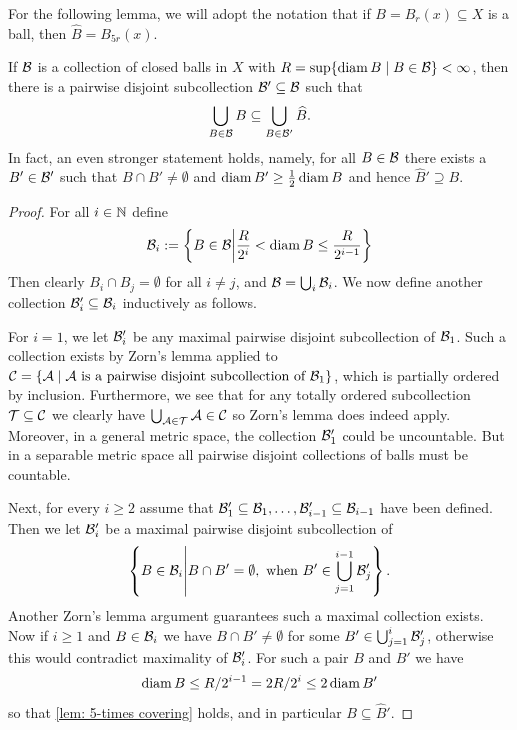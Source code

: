 For the following lemma, we will adopt the notation that if $B=B_r(x) \subseteq X$ is a ball, then $\widehat B=B_{5r}(x)$.
\begin{lemma}\label{lem: 5-times covering}
If $\mathcal{B}$ is a collection of closed balls in $X$ with $R=\sup\{\operatorname{diam} B \mid B \in \mathcal{B}\} < \infty$, then there is a pairwise disjoint subcollection $\mathcal{B}' \subseteq \mathcal{B}$ such that
\[
    \bigcup_{B \in \mathcal{B}} B \subseteq \bigcup_{B \in \mathcal{B}'} \widehat B.
\]
In fact, an even stronger statement holds, namely, for all $B \in \mathcal{B}$ there exists a $B' \in \mathcal{B}'$ such that $B \cap B' \neq \emptyset$ and $\operatorname{diam} B' \ge \frac{1}{2}\operatorname{diam} B$ and hence $\widehat B' \supseteq B$.
\end{lemma}
\begin{proof}
For all $i \in \mathbb{N}$ define
\[
    \mathcal{B}_i := \left\{ B \in \mathcal{B} \middle| \frac{R}{2^i} < \operatorname{diam} B \le \frac{R}{2^{i-1}} \right\}
\]
Then clearly $B_i \cap B_j = \emptyset$ for all $i \neq j$, and $\mathcal{B} = \bigcup_i \mathcal{B}_i$. We now define another collection $\mathcal{B}'_i \subseteq \mathcal{B}_i$ inductively as follows.

For $i=1$, we let $\mathcal{B}'_i$ be any maximal pairwise disjoint subcollection of $\mathcal{B}_1$. Such a collection exists by Zorn's lemma applied to $\mathcal{C} = \{ \mathcal{A} \mid \mathcal{A} \text{ is a pairwise disjoint subcollection of } \mathcal{B}_1\}$, which is partially ordered by inclusion. Furthermore, we see that for any totally ordered subcollection $\mathcal{T} \subseteq \mathcal{C}$ we clearly have $\bigcup_{\mathcal{A} \in \mathcal{T}} \mathcal{A} \in \mathcal{C}$ so Zorn's lemma does indeed apply. Moreover, in a general metric space, the collection $\mathcal{B}'_1$ could be uncountable. But in a separable metric space all pairwise disjoint collections of balls must be countable.

Next, for every $i \ge 2$ assume that $\mathcal{B}'_1 \subseteq \mathcal{B}_1, \dots, \mathcal{B}'_{i-1} \subseteq \mathcal{B}_{i-1}$ have been defined. Then we let $\mathcal{B}'_i$ be a maximal pairwise disjoint subcollection of 
\[
    \left\{B \in \mathcal{B}_i \middle| B \cap B' = \emptyset, \text{ when } B' \in \bigcup_{j=1}^{i-1} \mathcal{B}'_j\right\}.
\]
Another Zorn's lemma argument guarantees such a maximal collection exists. Now if $i \ge 1$ and $B \in \mathcal{B}_i$ we have $B \cap B' \neq \emptyset$ for some $B' \in \bigcup_{j=1}^i \mathcal{B}'_j$, otherwise this would contradict maximality of $\mathcal{B}'_i$. For such a pair $B$ and $B'$ we have
\[
    \operatorname{diam} B \le R/2^{i-1}=2R/2^i \le 2 \operatorname{diam} B'
\]
so that \cref{lem: 5-times covering} holds, and in particular $B \subseteq \widehat B'$.
\end{proof}

